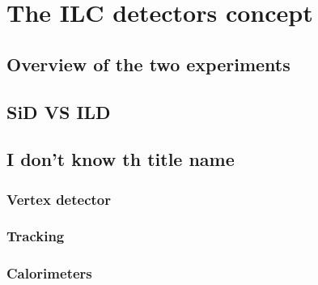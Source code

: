   \section{The ILC detectors concept}

    \subsection{Overview of the two experiments}
      \subsection{SiD VS ILD}

    \subsection{I don't know th title name}
      \subsubsection{Vertex detector}
      \subsubsection{Tracking}
      \subsubsection{Calorimeters}
